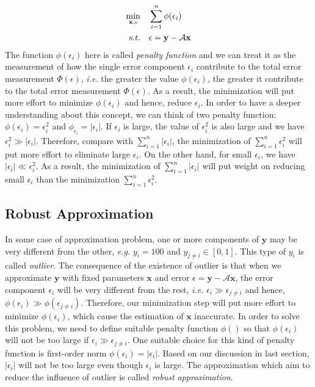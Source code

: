 \documentclass[10pt,a4paper]{article}
\begin{document}
\begin{equation*}
	\begin{aligned}
		\displaystyle\min_{\mathbf{x}, \epsilon} \quad & \displaystyle\sum_{i = 1}^{n} \phi(\epsilon_{i}) \\
		\textsl{s.t.} \quad & \epsilon = \mathbf{y} - \mathcal{A} \mathbf{x}
	\end{aligned} 
\end{equation*}
The function $\phi(\epsilon_{i})$ here is called \textit{penalty function} and we can treat it as the measurement of how the single error component $\epsilon_{i}$ contribute to the total error measurement $\Phi(\epsilon)$, \textsl{i.e.} the greater the value $\phi(\epsilon_{i})$, the greater it contribute to the total error measurement $\Phi(\epsilon)$. As a result, the minimization will put more effort to minimize $\phi(\epsilon_{i})$ and hence, reduce $\epsilon_{i}$. In order to have a deeper understanding about this concept, we can think of two penalty function: $\phi(\epsilon_{i}) = \epsilon_{i}^{2}$ and $\phi_{\epsilon_{i}} = |\epsilon_{i}|$. If $\epsilon_{i}$ is large, the value of $\epsilon_{i}^{2}$ is also large and we have $\epsilon_{i}^{2} \gg |\epsilon_{i}|$. Therefore, compare with $\displaystyle\sum_{i = 1}^{n} |\epsilon_{i}|$, the minimization of $\displaystyle\sum_{i = 1}^{n} \epsilon_{i}^{2}$ will put more effort to eliminate large $\epsilon_{i}$. On the other hand, for small $\epsilon_{i}$, we have $|\epsilon_{i}| \ll \epsilon_{i}^{2}$. As a result, the minimization of $\displaystyle\sum_{i = 1}^{n} |\epsilon_{i}|$ will put weight on reducing small $\epsilon_{i}$ than the minimization $\displaystyle\sum_{i = 1}^{n} \epsilon_{i}^{2}$.
\subsection{Robust Approximation}
In some case of approximation problem, one or more components of $\mathbf{y}$ may be very different from the other, \textsl{e.g.} $y_{i} = 100$ and $y_{j \neq i} \in [0, 1]$. This type of $y_{i}$ is called \textit{outlier}. The consequence of the existence of outlier is that when we approximate $\mathbf{y}$ with fixed parameters $\mathbf{x}$ and error $\epsilon = \mathbf{y} - \mathcal{A} \mathbf{x}$, the error component $\epsilon_{i}$ will be very different from the rest, \textsl{i.e.} $\epsilon_{i} \gg \epsilon_{j \neq i}$ and hence, $\phi(\epsilon_{i}) \gg \phi(\epsilon_{j \neq i})$. Therefore, our minimization step will put more effort to minimize $\phi(\epsilon_{i})$, which cause the estimation of $\mathbf{x}$ inaccurate. In order to solve this problem, we need to define suitable penalty function $\phi()$ so that $\phi(\epsilon_{i})$ will not be too large if $\epsilon_{i} \gg \epsilon_{j \neq i}$. One suitable choice for this kind of penalty function is first-order norm $\phi(\epsilon_{i}) = |\epsilon_{i}|$. Based on our discussion in last section, $|\epsilon_{i}|$ will not be too large even though $\epsilon_{i}$ is large. The approximation which aim to reduce the influence of outlier is called \textit{robust approximation}.
\end{document}
